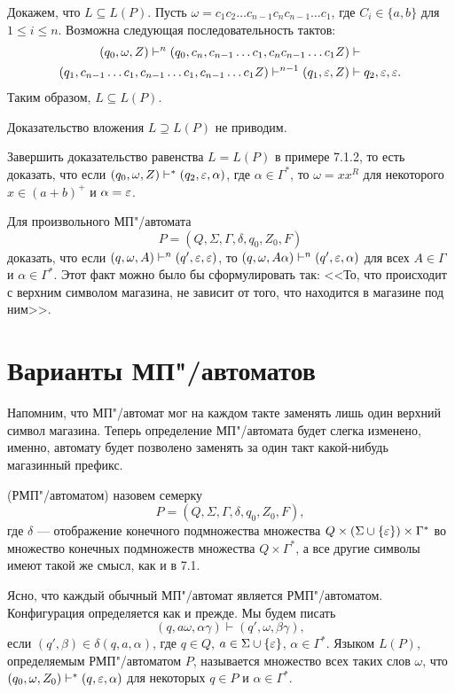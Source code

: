 \begin{myexample}
Докажем, что $L\subseteq L(P)$. Пусть $\omega=c_1c_2\ldots c_{n-1}c_nc_{n-1}\ldots c_1$, где $C_i\in\{a,b\}$ для $1\le i\le n$. Возможна следующая последовательность тактов:
\begin{multline*}
(q_0,\omega,Z) \vdash^n (q_0,c_n,c_{n-1}\ldots c_1,c_nc_{n-1}\ldots c_1Z) \vdash \\ (q_1,c_{n-1}\ldots c_1,c_{n-1}\ldots c_1,c_{n-1}\ldots c_1Z) \vdash^{n-1} (q_1,\varepsilon,Z) \vdash {q_2,\varepsilon,\varepsilon}.
\end{multline*}
Таким образом, $L\subseteq L(P)$.

Доказательство вложения $L\supseteq L(P)$ не приводим.
\end{myexample}

\begin{myproblem}
Завершить доказательство равенства $L=L(P)$ в примере 7.1.2, то есть доказать, что если $(q_0,\omega,Z)\vdash^*(q_2,\varepsilon,\alpha)$, где $\alpha\in\Gamma^*$, то $\omega=xx^R$ для некоторого $x\in(a+b)^+$ и $\alpha=\varepsilon$.
\end{myproblem}

\begin{myproblem}
Для произвольного МП"/автомата
\[
P=(Q,\Sigma,\Gamma,\delta,q_0,Z_0,F)
\]
доказать, что если $(q,\omega,A)\vdash^n(q',\varepsilon,\varepsilon)$, то $(q,\omega,A\alpha)\vdash^n(q',\varepsilon,\alpha)$ для всех $A\in\Gamma$ и $\alpha\in\Gamma^*$. Этот факт можно было бы сформулировать так: <<То, что происходит с верхним символом магазина, не зависит от того, что находится в магазине под ним>>.
\end{myproblem}

\section{Варианты МП"/автоматов}
\label{Chapter8FSMSMVariants}

Напомним, что МП"/автомат мог на каждом такте заменять лишь один верхний символ магазина. Теперь определение МП"/автомата будет слегка изменено, именно, автомату будет позволено заменять за один такт какой-нибудь магазинный префикс.

 (РМП"/автоматом) назовем семерку
\[
P=(Q,\Sigma,\Gamma,\delta,q_0,Z_0,F),
\]
где $\delta$ --- отображение конечного подмножества множества
$Q\times(\Sigma\cup\{\varepsilon\})\times\Gamma^*$ во множество конечных подмножеств множества $Q\times\Gamma^*$, а все другие символы имеют такой же смысл, как и в 7.1.

Ясно, что каждый обычный МП"/автомат является РМП"/автоматом. Конфигурация определяется как и прежде. Мы будем писать
\[
(q,a\omega,\alpha\gamma)\vdash(q',\omega,\beta\gamma),
\]
если $(q',\beta)\in\delta(q,a,\alpha)$, где $q\in Q$, $a\in\Sigma\cup\{\varepsilon\}$, $\alpha\in\Gamma^*$. Языком $L(P)$, определяемым РМП"/автоматом $P$, называется множество всех таких слов $\omega$, что $(q_0,\omega,Z_0)\vdash^*(q,\varepsilon,\alpha)$ для некоторых $q\in P$ и $\alpha\in\Gamma^*$.


